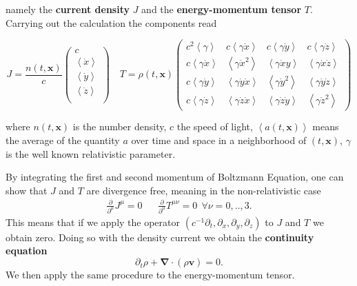 namely the \textbf{current density} $J$ and the \textbf{energy-momentum tensor} $T$. Carrying out the calculation the components read 


\[
  J= \frac{n(t,\mathbf{x})}{c}
  \begin{pmatrix}
    c \\
    \left< \dot{x} \right> \\
    \left< \dot{y} \right> \\
    \left< \dot{z} \right> \\
  \end{pmatrix}\quad
  T= \rho(t,\mathbf{x})
  \begin{pmatrix}
    c^2 \left< \gamma \right> & c \left< \gamma \dot{x} \right> &  c \left< \gamma \dot{y} \right> & c \left< \gamma \dot{z} \right> \\
     c \left< \gamma \dot{x} \right> & \left< \gamma \dot{x}^2 \right> &  \left< \gamma \dot{x}y \right> &  \left< \gamma \dot{x} \dot{z} \right>  \\
     c \left< \gamma \dot{y} \right> &  \left< \gamma \dot{y} \dot{x} \right>&  \left< \gamma \dot{y}^2 \right> &  \left< \gamma \dot{y} \dot{z} \right>  \\
     c \left< \gamma \dot{z} \right> &  \left< \gamma \dot{z}\dot{x} \right>& \left< \gamma \dot{z}\dot{y} \right> &  \left< \gamma \dot{z}^2 \right> 
  \end{pmatrix}
\]

where $n(t, \mathbf{x})$ is the number density, $c$ the speed of light,  $\left< a(t,\mathbf{x}) \right>$ means the average of the quantity $a$ over time and space in a neighborhood of $(t, \mathbf{x})$, $\gamma$ is the well known relativistic parameter.

By integrating the first and second momentum of Boltzmann Equation, one can show that $J$ and $T$ are divergence free, meaning in the non-relativistic case
\begin{align}
\frac{\partial }{\partial^{\mu}}J^{\mu}=0 && \frac{\partial }{\partial^{\mu}}T^{\mu \nu}=0 \  \  \forall \nu =0,..,3 .
\end{align}
This means that if we apply the operator $(c^{-1}\partial_t,\partial_x,\partial_y,\partial_z)$ to $J$ and $T$ we obtain zero. Doing so with the density current we obtain the \textbf{continuity equation}
\begin{equation} \label{cont}
	\partial_t \rho + \mathbf{\nabla} \cdot (\rho \mathbf{v})=0.
\end{equation}
We then apply the same procedure to the energy-momentum tensor.

